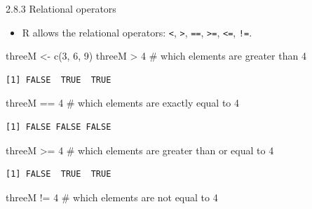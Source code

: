 \documentclass[
  9pt,
  a4paper,
  ignorenonframetext,
  notheorems]{beamer}
\newenvironment{Shaded}{\begin{snugshade}}{\end{snugshade}}
\newcommand{\CommentTok}[1]{\textcolor[rgb]{0.37,0.37,0.37}{#1}}
\newcommand{\DecValTok}[1]{\textcolor[rgb]{0.68,0.00,0.00}{#1}}
\newcommand{\FunctionTok}[1]{\textcolor[rgb]{0.28,0.35,0.67}{#1}}
\newcommand{\NormalTok}[1]{\textcolor[rgb]{0.00,0.23,0.31}{#1}}
\newcommand{\OtherTok}[1]{\textcolor[rgb]{0.00,0.23,0.31}{#1}}
\newcommand{\SpecialCharTok}[1]{\textcolor[rgb]{0.37,0.37,0.37}{#1}}
\providecommand{\tightlist}{%
  \setlength{\itemsep}{0pt}\setlength{\parskip}{0pt}}\usepackage{longtable,booktabs,array}
\begin{document}
\begin{frame}[fragile]
\begin{block}{2.8.3 Relational operators}
\protect\hypertarget{relational-operators}{}
\begin{itemize}
\tightlist
\item
  R allows the relational operators: \texttt{\textless{}},
  \texttt{\textgreater{}}, \texttt{==}, \texttt{\textgreater{}=},
  \texttt{\textless{}=}, \texttt{!=}.
\end{itemize}

\begin{Shaded}
\begin{Highlighting}[]
\NormalTok{threeM }\OtherTok{\textless{}{-}} \FunctionTok{c}\NormalTok{(}\DecValTok{3}\NormalTok{, }\DecValTok{6}\NormalTok{, }\DecValTok{9}\NormalTok{)}
\NormalTok{threeM }\SpecialCharTok{\textgreater{}} \DecValTok{4} \CommentTok{\# which elements are greater than 4}
\end{Highlighting}
\end{Shaded}

\begin{verbatim}
[1] FALSE  TRUE  TRUE
\end{verbatim}

\begin{Shaded}
\begin{Highlighting}[]
\NormalTok{threeM }\SpecialCharTok{==} \DecValTok{4}   \CommentTok{\# which elements are exactly equal to 4}
\end{Highlighting}
\end{Shaded}

\begin{verbatim}
[1] FALSE FALSE FALSE
\end{verbatim}

\begin{Shaded}
\begin{Highlighting}[]
\NormalTok{threeM }\SpecialCharTok{\textgreater{}=} \DecValTok{4}   \CommentTok{\# which elements are greater than or equal to 4}
\end{Highlighting}
\end{Shaded}

\begin{verbatim}
[1] FALSE  TRUE  TRUE
\end{verbatim}

\begin{Shaded}
\begin{Highlighting}[]
\NormalTok{threeM }\SpecialCharTok{!=} \DecValTok{4}   \CommentTok{\# which elements are not equal to 4}
\end{Highlighting}
\end{Shaded}


\end{block}
\end{frame}
\end{document}
